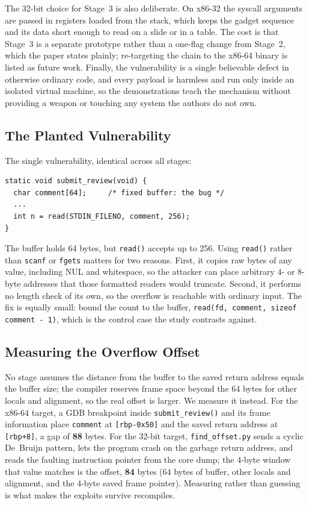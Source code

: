 \documentclass[10pt,twocolumn,letterpaper]{article}
\newcommand{\code}[1]{\texttt{\small #1}}
\begin{document}
The 32-bit choice for Stage~3 is also deliberate. On x86-32 the syscall arguments
are passed in registers loaded from the stack, which keeps the gadget sequence
and its data short enough to read on a slide or in a table. The cost is that
Stage~3 is a separate prototype rather than a one-flag change from Stage~2, which
the paper states plainly; re-targeting the chain to the x86-64 binary is listed
as future work. Finally, the vulnerability is a single believable defect in
otherwise ordinary code, and every payload is harmless and run only inside an
isolated virtual machine, so the demonstrations teach the mechanism without
providing a weapon or touching any system the authors do not own.

\subsection{The Planted Vulnerability}
The single vulnerability, identical across all stages:
\begin{lstlisting}[style=c]
static void submit_review(void) {
  char comment[64];     /* fixed buffer: the bug */
  ...
  int n = read(STDIN_FILENO, comment, 256);
}
\end{lstlisting}
\noindent The buffer holds 64 bytes, but \code{read()} accepts up to 256. Using
\code{read()} rather than \code{scanf} or \code{fgets} matters for two reasons.
First, it copies raw bytes of any value, including NUL and whitespace, so the
attacker can place arbitrary 4- or 8-byte addresses that those formatted readers
would truncate. Second, it performs no length check of its own, so the overflow
is reachable with ordinary input. The fix is equally small: bound the count to
the buffer, \code{read(fd, comment, sizeof comment - 1)}, which is the control
case the study contrasts against.

\subsection{Measuring the Overflow Offset}
No stage assumes the distance from the buffer to the saved return address equals
the buffer size; the compiler reserves frame space beyond the 64 bytes for other
locals and alignment, so the real offset is larger. We measure it instead. For
the x86-64 target, a GDB breakpoint inside \code{submit\_review()} and its frame
information place \code{comment} at \code{[rbp-0x50]} and the saved return
address at \code{[rbp+8]}, a gap of \textbf{88} bytes. For the 32-bit target,
\code{find\_offset.py} sends a cyclic De~Bruijn pattern, lets the program crash
on the garbage return address, and reads the faulting instruction pointer from
the core dump; the 4-byte window that value matches is the offset, \textbf{84}
bytes (64 bytes of buffer, other locals and alignment, and the 4-byte saved
frame pointer). Measuring rather than guessing is what makes the exploits
survive recompiles.
\end{document}
